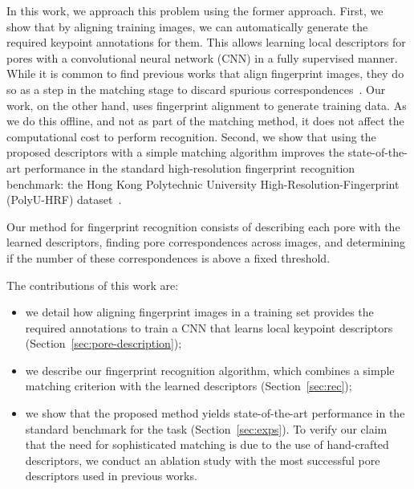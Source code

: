 \documentclass[10pt,twocolumn,letterpaper]{article}
\begin{document}
In this work, we approach this problem using the former approach.
First, we show that by aligning training images, we can automatically generate the required keypoint annotations for them.
This allows learning local descriptors for pores with a convolutional neural network (CNN) in a fully supervised manner.
While it is common to find previous works that align fingerprint images, they do so as a step in the matching stage to discard spurious correspondences~\cite{direct-pore, td-sparse}.
Our work, on the other hand, uses fingerprint alignment to generate training data.
As we do this offline, and not as part of the matching method, it does not affect the computational cost to perform recognition.
Second, we show that using the proposed descriptors with a simple matching algorithm improves the state-of-the-art performance in the standard high-resolution fingerprint recognition benchmark: the Hong Kong Polytechnic University High-Resolution-Fingerprint (PolyU-HRF) dataset~\cite{direct-pore}.

Our method for fingerprint recognition consists of describing each pore with the learned descriptors, finding pore correspondences across images, and determining if the number of these correspondences is above a fixed threshold.

The contributions of this work are:
\begin{itemize}
\item we detail how aligning fingerprint images in a training set provides the required annotations to train a CNN that learns local keypoint descriptors (Section~\ref{sec:pore-description});

\item we describe our fingerprint recognition algorithm, which combines a simple matching criterion with the learned descriptors (Section~\ref{sec:rec});

\item we show that the proposed method yields state-of-the-art performance in the standard benchmark for the task (Section~\ref{sec:exps}).
  To verify our claim that the need for sophisticated matching is due to the use of hand-crafted descriptors, we conduct an ablation study with the most successful pore descriptors used in previous works.
\end{itemize}
\end{document}
